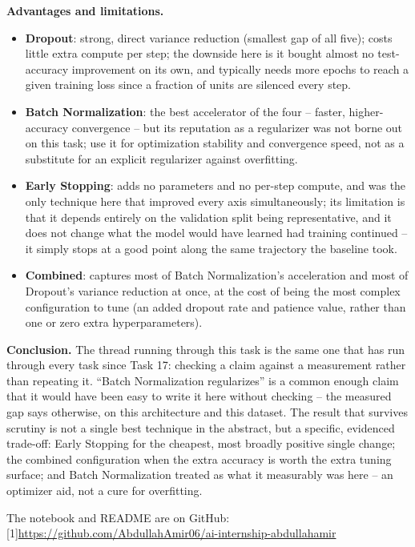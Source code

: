 \documentclass[11pt,a4paper]{article}
\begin{document}
\textbf{Advantages and limitations.}
\begin{itemize}
    \item \textbf{Dropout}: strong, direct variance reduction (smallest gap of all
    five); costs little extra compute per step; the downside here is it bought almost
    no test-accuracy improvement on its own, and typically needs more epochs to reach a
    given training loss since a fraction of units are silenced every step.
    \item \textbf{Batch Normalization}: the best accelerator of the four -- faster,
    higher-accuracy convergence -- but its reputation as a regularizer was not borne out
    on this task; use it for optimization stability and convergence speed, not as a
    substitute for an explicit regularizer against overfitting.
    \item \textbf{Early Stopping}: adds no parameters and no per-step compute, and was
    the only technique here that improved every axis simultaneously; its limitation is
    that it depends entirely on the validation split being representative, and it does
    not change what the model would have learned had training continued -- it simply
    stops at a good point along the same trajectory the baseline took.
    \item \textbf{Combined}: captures most of Batch Normalization's acceleration and
    most of Dropout's variance reduction at once, at the cost of being the most complex
    configuration to tune (an added dropout rate and patience value, rather than one or
    zero extra hyperparameters).
\end{itemize}

\textbf{Conclusion.} The thread running through this task is the same one that has run
through every task since Task 17: checking a claim against a measurement rather than
repeating it. ``Batch Normalization regularizes'' is a common enough claim that it would
have been easy to write it here without checking -- the measured gap says otherwise, on
this architecture and this dataset. The result that survives scrutiny is not a single
best technique in the abstract, but a specific, evidenced trade-off: Early Stopping for
the cheapest, most broadly positive single change; the combined configuration when the
extra accuracy is worth the extra tuning surface; and Batch Normalization treated as
what it measurably was here -- an optimizer aid, not a cure for overfitting.

\vspace{0.4cm}
\noindent The notebook and README are on GitHub: {\small\scalebox{0.72}[1]{\url{https://github.com/AbdullahAmir06/ai-internship-abdullahamir}}}
\end{document}
